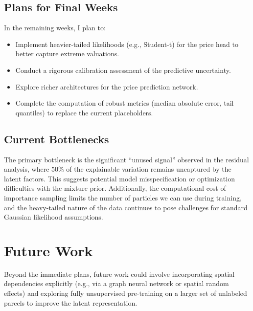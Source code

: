 \documentclass[11pt]{article}
\begin{document}
\subsection*{Plans for Final Weeks}
In the remaining weeks, I plan to:
\begin{itemize}
    \item Implement heavier-tailed likelihoods (e.g., Student-t) for the price head to better capture extreme valuations.
    \item Conduct a rigorous calibration assessment of the predictive uncertainty.
    \item Explore richer architectures for the price prediction network.
    \item Complete the computation of robust metrics (median absolute error, tail quantiles) to replace the current placeholders.
\end{itemize}

\subsection*{Current Bottlenecks}
The primary bottleneck is the significant ``unused signal'' observed in the residual analysis, where 50\% of the explainable variation remains uncaptured by the latent factors. This suggests potential model misspecification or optimization difficulties with the mixture prior. Additionally, the computational cost of importance sampling limits the number of particles we can use during training, and the heavy-tailed nature of the data continues to pose challenges for standard Gaussian likelihood assumptions.

\section*{Future Work}
Beyond the immediate plans, future work could involve incorporating spatial dependencies explicitly (e.g., via a graph neural network or spatial random effects) and exploring fully unsupervised pre-training on a larger set of unlabeled parcels to improve the latent representation.
\end{document}
